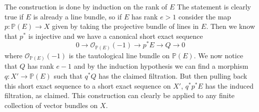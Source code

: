 \documentclass[a4paper,openany]{scrbook}
\begin{document}
The construction is done by induction on the rank of $E$ The statement is clearly true if $E$ is already a line bundle, so if $E$ has rank $e>1$ consider the map $p\colon \mathbb{P}(E) \rightarrow X$ given by taking the projective bundle of lines in $E$. Then we know that $p^\ast$ is injective and we have a canonical short exact sequence
\[
0 \to \mathcal{O}_{\mathbb{P}(E)}(-1) \to p^\ast E \to Q \to 0
\]
where $\mathcal{O}_{\mathbb{P}(E)}(-1) $ is the tautological line bundle on $\mathbb{P}(E).$ We now notice that $Q$ has rank $e-1$ and by the induction hypothesis we can find a morphism $q\colon X' \rightarrow \mathbb{P}(E)$ such that $q^\ast Q$ has the claimed filtration. But then pulling back this short exact sequence to a short exact sequence on $X'$, $q^\ast p^\ast E$ has the induced filtration, as claimed. This construction can clearly be applied to any finite collection of vector bundles on $X$.
\end{document}
